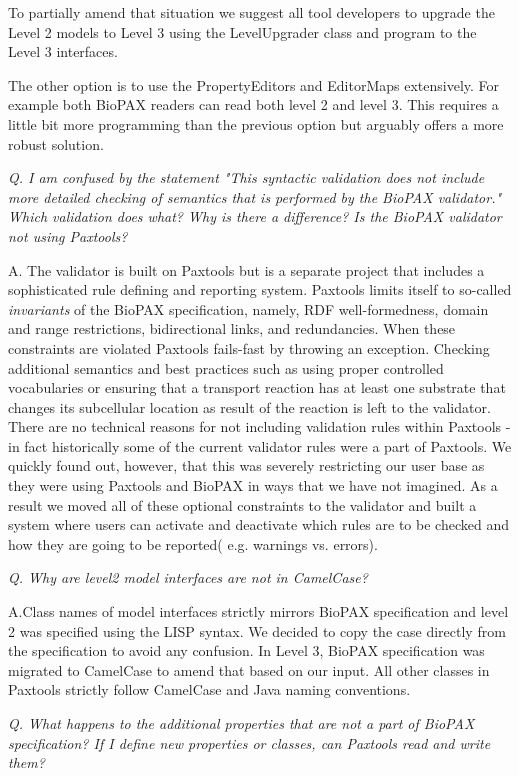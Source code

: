 \documentclass{tufte-book}
\begin{document}
To partially amend that situation we suggest all tool developers to upgrade the Level 2 models to Level 3 using the LevelUpgrader class and program to the Level 3 interfaces.  

The other option is to use the PropertyEditors and EditorMaps extensively. For example both BioPAX readers can read both level 2 and level 3. This requires a little bit more programming than the previous option but arguably offers a more robust solution. 

\textit{Q. I am confused by the statement "This syntactic validation does not include more detailed checking of semantics that is performed by the BioPAX validator." Which validation does what? Why is there a difference? Is the BioPAX validator not using Paxtools?}

A. The validator is built on Paxtools but is a separate project that includes a sophisticated rule defining and reporting system. Paxtools limits itself to so-called \textit{invariants} of the BioPAX specification, namely, RDF well-formedness, domain and range restrictions, bidirectional links, and redundancies. When these constraints are violated Paxtools fails-fast  by throwing an exception. Checking additional semantics and best practices such as using proper controlled vocabularies or ensuring that a transport reaction has at least one substrate that changes its subcellular location as result of the reaction is left to the validator. There are no technical reasons for not including validation rules within Paxtools - in fact historically some of the current validator rules were a part of Paxtools. We quickly found out, however, that this was severely restricting our user base as they were using Paxtools and BioPAX in ways that we have not imagined. As a result we moved all of these optional constraints to the validator and built a system where users can activate and deactivate which rules are to be checked and how they are going to be reported( e.g. warnings vs. errors). 

\textit{Q. Why are level2 model interfaces are not in CamelCase?}

A.Class names of model interfaces strictly mirrors BioPAX specification and level 2 was specified using the LISP syntax.  We decided to copy the case directly from the specification to avoid any confusion.  In Level 3, BioPAX specification was migrated to CamelCase to amend that based on our input. All other classes in Paxtools strictly follow CamelCase and Java naming conventions. 

\textit{Q. What happens to the additional properties that are not a part of BioPAX specification? If I define new properties or classes, can Paxtools read and write them?}
\end{document}
